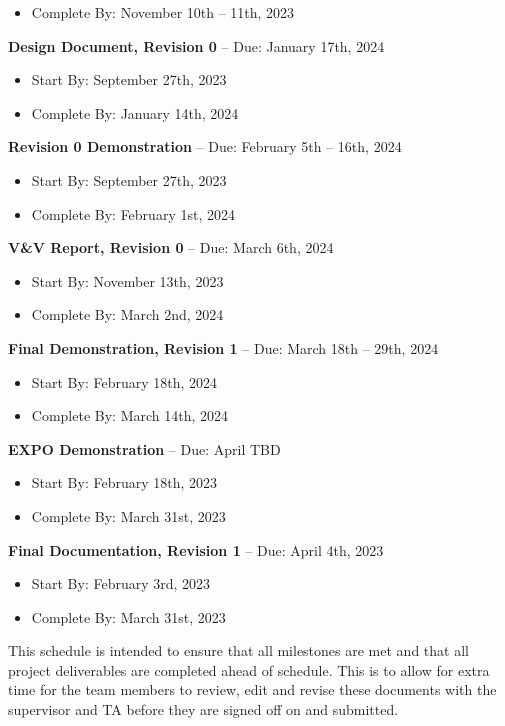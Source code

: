 \documentclass{article}
\begin{document}
\begin{itemize}
\begin{item}
\begin{itemize}
\item Complete By: November 10th – 11th, 2023
\end{itemize}
\end{item}
\begin{item}
\textbf{Design Document, Revision 0} – Due: January 17th, 2024
\begin{itemize}
\item Start By: September 27th, 2023
\item Complete By: January 14th, 2024
\end{itemize}
\end{item}
\begin{item}
\textbf{Revision 0 Demonstration} – Due: February 5th – 16th, 2024
\begin{itemize}
\item Start By: September 27th, 2023
\item Complete By: February 1st, 2024
\end{itemize}
\end{item}
\begin{item}
\textbf{V\&V Report, Revision 0} – Due: March 6th, 2024
\begin{itemize}
\item Start By: November 13th, 2023
\item Complete By: March 2nd, 2024
\end{itemize}
\end{item}
\begin{item}
\textbf{Final Demonstration, Revision 1} – Due: March 18th – 29th, 2024
\begin{itemize}
\item Start By: February 18th, 2024
\item Complete By: March 14th, 2024
\end{itemize}
\end{item}
\begin{item}
\textbf{EXPO Demonstration} – Due: April TBD
\begin{itemize}
\item Start By: February 18th, 2023
\item Complete By: March 31st, 2023
\end{itemize}
\end{item}
\begin{item}
\textbf{Final Documentation, Revision 1} – Due: April 4th, 2023
\begin{itemize}
\item Start By: February 3rd, 2023
\item Complete By: March 31st, 2023
\end{itemize}
\end{item}
\end{itemize}

\noindent This schedule is intended to ensure that all milestones are met and that all project deliverables are completed ahead of schedule.
This is to allow for extra time for the team members to review, edit and revise these documents with the supervisor and TA before they are signed off on and submitted.
\end{document}
